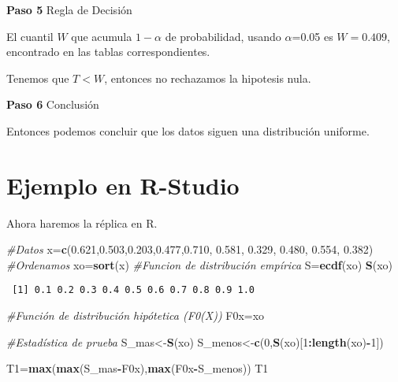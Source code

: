 \documentclass[a4paper,oneside,openany]{book}
\newenvironment{Shaded}{\begin{snugshade}}{\end{snugshade}}
\newcommand{\KeywordTok}[1]{\textcolor[rgb]{0.13,0.29,0.53}{\textbf{#1}}}
\newcommand{\DecValTok}[1]{\textcolor[rgb]{0.00,0.00,0.81}{#1}}
\newcommand{\FloatTok}[1]{\textcolor[rgb]{0.00,0.00,0.81}{#1}}
\newcommand{\CommentTok}[1]{\textcolor[rgb]{0.56,0.35,0.01}{\textit{#1}}}
\newcommand{\OperatorTok}[1]{\textcolor[rgb]{0.81,0.36,0.00}{\textbf{#1}}}
\newcommand{\NormalTok}[1]{#1}
\begin{document}
\textbf{Paso 5} Regla de Decisión

El cuantil \(W\) que acumula \(1-\alpha\) de probabilidad, usando
\(\alpha\)=0.05 es \(W=0.409\), encontrado en las tablas
correspondientes.

Tenemos que \(T<W\), entonces no rechazamos la hipotesis nula.

\textbf{Paso 6} Conclusión

Entonces podemos concluir que los datos siguen una distribución
uniforme.

\section{Ejemplo en R-Studio}\label{ejemplo-en-r-studio-14}

Ahora haremos la réplica en R.

\begin{Shaded}
\begin{Highlighting}[]
\CommentTok{#Datos}
\NormalTok{x=}\KeywordTok{c}\NormalTok{(}\FloatTok{0.621}\NormalTok{,}\FloatTok{0.503}\NormalTok{,}\FloatTok{0.203}\NormalTok{,}\FloatTok{0.477}\NormalTok{,}\FloatTok{0.710}\NormalTok{, }\FloatTok{0.581}\NormalTok{, }\FloatTok{0.329}\NormalTok{, }\FloatTok{0.480}\NormalTok{, }\FloatTok{0.554}\NormalTok{, }\FloatTok{0.382}\NormalTok{)}
\CommentTok{#Ordenamos}
\NormalTok{xo=}\KeywordTok{sort}\NormalTok{(x)}
\CommentTok{#Funcion de distribución empírica}
\NormalTok{S=}\KeywordTok{ecdf}\NormalTok{(xo)}
\KeywordTok{S}\NormalTok{(xo)}
\end{Highlighting}
\end{Shaded}

\begin{verbatim}
 [1] 0.1 0.2 0.3 0.4 0.5 0.6 0.7 0.8 0.9 1.0
\end{verbatim}

\begin{Shaded}
\begin{Highlighting}[]
\CommentTok{#Función de distribución hipótetica (F0(X))}
\NormalTok{F0x=xo}

\CommentTok{#Estadística de prueba}
\NormalTok{S_mas<-}\KeywordTok{S}\NormalTok{(xo)}
\NormalTok{S_menos<-}\KeywordTok{c}\NormalTok{(}\DecValTok{0}\NormalTok{,}\KeywordTok{S}\NormalTok{(xo)[}\DecValTok{1}\OperatorTok{:}\KeywordTok{length}\NormalTok{(xo)}\OperatorTok{-}\DecValTok{1}\NormalTok{])}

\NormalTok{T1=}\KeywordTok{max}\NormalTok{(}\KeywordTok{max}\NormalTok{(S_mas}\OperatorTok{-}\NormalTok{F0x),}\KeywordTok{max}\NormalTok{(F0x}\OperatorTok{-}\NormalTok{S_menos))}
\NormalTok{T1}
\end{Highlighting}
\end{Shaded}
\end{document}
